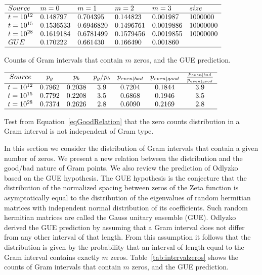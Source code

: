 \documentclass[twoside]{article}
\theoremstyle{definition}
\begin{document}
\begin{table}
\centering \(\begin{array}{llllll}
\hline
Source &m = 0&m = 1&m = 2&m = 3&size\\
\hline
t = 10^{12}&0.148797&0.704395&0.144823&0.001987&1000000\\
t = 10^{15}&0.1536533&0.6946820&0.1496761&0.0019886&10000000\\
t = 10^{28}&0.1619184&0.6781499&0.1579456&0.0019855&10000000\\
 GUE&0.170222&0.661430&0.166490&0.001860&\\
\hline
\end{array}\)
\caption{Counts of Gram intervals that contain $m$ zeros, and the GUE prediction.} \label{tab:intervalzeros}
\end{table}

\begin{table}
\centering \(\begin{array}{ccccccc}
\hline
Source &p_g&p_b& p_g/p_b&p_{even|bad} &p_{even|good}&\frac{p_{even|bad}}{p_{even|good}}\\
\hline
t = 10^{12}&0.7962&0.2038&3.9&0.7204&0.1844&3.9\\
t = 10^{15}&0.7792&0.2208&3.5&0.6868&0.1946&3.5\\
t = 10^{28}&0.7374&0.2626&2.8&0.6090&0.2169&2.8\\
\hline
\end{array}\)
\caption{Test from  Equation~\ref{eqGoodRelation} that the zero counts distribution in a Gram interval is not independent of Gram type.} \label{tab:pevenpred}
\end{table}

In this section we consider the distribution of Gram intervals that contain a given number of zeros. We present a new relation between the distribution and the good/bad nature of Gram points. We also review the prediction of Odlyzko~\cite{Odlyzko 1992} based on the GUE hypothesis. The GUE hypothesis  is the conjecture that the distribution of the normalized spacing between zeros of the Zeta function is asymptotically equal to the distribution of the eigenvalues of random hermitian matrices with independent normal distribution of its coefficients. Such random hermitian matrices are called the Gauss unitary ensemble (GUE).  Odlyzko derived the GUE prediction by assuming that a Gram interval does not differ from any other interval of that length. From this assumption it follows that the distribution is given by the probability that an interval of length equal to the Gram interval contains exactly $m$ zeros. Table~\ref{tab:intervalzeros} shows the counts of Gram intervals that contain $m$ zeros, and the GUE prediction.
\end{document}
